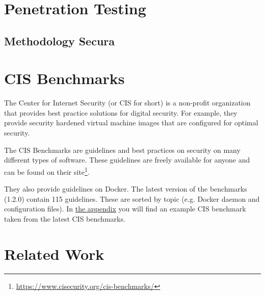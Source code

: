 \section{Penetration Testing}
\subsection{Methodology Secura}

\section{CIS Benchmarks}
The Center for Internet Security (or CIS for short) is a non-profit organization that provides best practice solutions for digital security. For example, they provide security hardened virtual machine images that are configured for optimal security.

\hfill

The CIS Benchmarks are guidelines and best practices on security on many different types of software. These guidelines are freely available for anyone and can be found on their site\footnote{\url{https://www.cisecurity.org/cis-benchmarks/}}.

\hfill

They also provide guidelines on Docker\cite{cis}. The latest version of the benchmarks (1.2.0) contain 115 guidelines. These are sorted by topic (e.g. Docker daemon and configuration files). In \hyperref[appendix:a]{the appendix} you will find an example CIS benchmark taken from the latest CIS benchmarks.

\section{Related Work}

